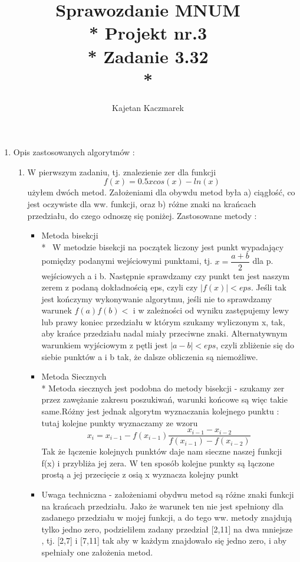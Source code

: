 \documentclass[a4paper, 11pt]{article}
\author{Kajetan Kaczmarek}
\begin{document}
\title{Sprawozdanie MNUM \\* Projekt nr.3 \\* 
Zadanie 3.32 \\*}
\maketitle

\begin{enumerate}

\item Opis zastosowanych algorytmów : 
\begin{enumerate}
\item W pierwszym zadaniu, tj. znalezienie zer dla funkcji \[f(x) = 0.5xcos(x) - ln(x) \] użyłem dwóch metod. Założeniami dla obywdu metod była a) ciągłość, co jest oczywiste dla ww. funkcji, oraz b) różne znaki na krańcach przedziału, do czego odnoszę się poniżej. Zastosowane metody : 
\begin{itemize} \, \item Metoda bisekcji \\* \, W metodzie bisekcji na początek liczony jest punkt wypadający pomiędzy podanymi wejściowymi punktami, tj. \( x = \dfrac{a+b}{2}\) dla p. wejściowych a i b. Następnie sprawdzamy czy punkt ten jest naszym zerem z podaną dokładnością eps, czyli czy \( |f(x)| < eps \). Jeśli tak jest kończymy wykonywanie algorytmu, jeśli nie to sprawdzamy warunek \( f(a) f(b) < \) i w zależności od wyniku zastępujemy lewy lub prawy koniec przedziału w którym szukamy wyliczonym x, tak, aby krańce przedziału nadal miały przeciwne znaki. Alternatywnym warunkiem wyjściowym z pętli jest \( |a-b|<eps \), czyli zbliżenie się do siebie punktów a i b tak, że dalsze obliczenia są niemożliwe.
\item Metoda Siecznych \\* Metoda siecznych jest podobna do metody bisekcji - szukamy zer przez zawężanie zakresu poszukiwań, warunki końcowe są więc takie same.Różny jest jednak algorytm wyznaczania kolejnego punktu : tutaj kolejne punkty wyznaczamy ze wzoru \[ x_i = x_{i-1} - f(x_{i-1})\dfrac{x_{i-1} - x_{i-2}}{f(x_{i-1}) - f(x_{i-2})} \]
Tak że łączenie kolejnych punktów daje nam sieczne naszej funkcji f(x) i przybliża jej zera. W ten sposób kolejne punkty są łączone prostą a jej przecięcie z osią x wyznacza kolejny punkt
\item Uwaga techniczna - założeniami obydwu metod są różne znaki funkcji na krańcach przedziału. Jako że warunek ten nie jest spełniony dla zadanego przedziału w mojej funkcji, a do tego ww. metody znajdują tylko jedno zero, podzieliłem zadany przedział [2,11] na dwa mniejsze , tj. [2,7] i [7,11] tak aby w każdym znajdowało się jedno zero, i aby spełniały one założenia metod.

\end{itemize}
\end{enumerate}
\end{enumerate}
\end{document}
